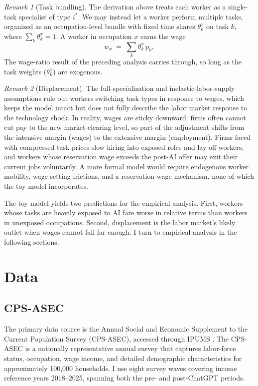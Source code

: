 \documentclass[11pt]{article}
\theoremstyle{plain}
\theoremstyle{remark}
\newtheorem{remark}{Remark}
\begin{document}
\begin{remark}[Task bundling]
The derivation above treats each worker as a single-task specialist of type $i^*$. We may instead let a worker perform multiple tasks, organized as an occupation-level bundle with fixed time shares $\theta_k^x$ on task $k$, where $\sum_k \theta_k^x = 1$. A worker in occupation $x$ earns the wage
\begin{equation}
  w_x \;=\; \sum_k \theta_k^x \, p_k,
  \label{eq:bundle}
\end{equation}
  The wage-ratio result of the preceding analysis carries through, so long as the task weights ($\theta_k^x$) are exogenous.
\end{remark}

\begin{remark}[Displacement]
The full-specialization and inelastic-labor-supply assumptions rule out workers switching task types in response to wages, which keeps the model intact but does not fully describe the labor market response to the technology shock.  In reality, wages are sticky downward: firms often cannot cut pay to the new market-clearing level, so part of the adjustment shifts from the intensive margin (wages) to the extensive margin (employment).  Firms faced with compressed task prices slow hiring into exposed roles and lay off workers, and workers whose reservation wage exceeds the post-AI offer may exit their current jobs voluntarily.  A more formal model would require endogenous worker mobility, wage-setting frictions, and a reservation-wage mechanism, none of which the toy model incorporates.
\end{remark}

The toy model yields two predictions for the empirical analysis. First, workers whose tasks are heavily exposed to AI fare worse in relative terms than workers in unexposed occupations. Second, displacement is the labor market's likely outlet when wages cannot fall far enough. I turn to empirical analysis in the following sections.

\section{Data}
\label{sec:data}

\subsection{CPS-ASEC}

The primary data source is the Annual Social and Economic Supplement to the Current Population Survey (CPS-ASEC), accessed through IPUMS \parencite{ipumscps2025}. The CPS-ASEC is a nationally representative annual survey that captures labor-force status, occupation, wage income, and detailed demographic characteristics for approximately 100,000 households. I use eight survey waves covering income reference years 2018--2025, spanning both the pre- and post-ChatGPT periods.
\end{document}
